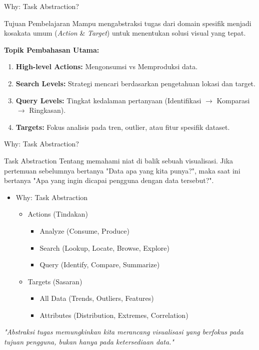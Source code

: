 \documentclass[t]{beamer}
\begin{document}
\begin{frame}{Why: Task Abstraction?}
    \begin{block}{Tujuan Pembelajaran}
        Mampu mengabstraksi tugas dari domain spesifik menjadi kosakata umum (\textit{Action} \& \textit{Target}) untuk menentukan solusi visual yang tepat.
    \end{block}

    \vspace{0.4cm}
    \textbf{Topik Pembahasan Utama:}
    \begin{enumerate}
        \item \textbf{High-level Actions:} Mengonsumsi vs Memproduksi data.
        \item \textbf{Search Levels:} Strategi mencari berdasarkan pengetahuan lokasi dan target.
        \item \textbf{Query Levels:} Tingkat kedalaman pertanyaan (Identifikasi $\rightarrow$ Komparasi $\rightarrow$ Ringkasan).
        \item \textbf{Targets:} Fokus analisis pada tren, outlier, atau fitur spesifik dataset.
    \end{enumerate}
\end{frame}

\begin{frame}{Why: Task Abstraction?}
    \vspace{-0.3cm}
    \begin{block}{Task Abstraction}
        	Tentang memahami niat di balik sebuah visualisasi. Jika pertemuan sebelumnya bertanya "Data apa yang kita punya?", maka saat ini bertanya "Apa yang ingin dicapai pengguna dengan data tersebut?".
    \end{block}
    \vspace{0.3cm}
	\begin{itemize}
		\item Why: Task Abstraction
		\begin{itemize}
			\item Actions (Tindakan)
				\begin{itemize}
					\item Analyze (Consume, Produce)
					\item Search (Lookup, Locate, Browse, Explore)
					\item Query (Identify, Compare, Summarize)
				\end{itemize}
			\item Targets (Sasaran)
				\begin{itemize}
					\item All Data (Trends, Outliers, Features)
					\item Attributes (Distribution, Extremes, Correlation)
				\end{itemize}
		\end{itemize}
	\end{itemize}	    
    
    \centering \textit{"Abstraksi tugas memungkinkan kita merancang visualisasi yang berfokus pada tujuan pengguna, bukan hanya pada ketersediaan data."}
\end{frame}
\end{document}
